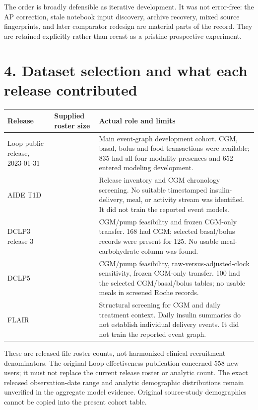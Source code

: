 \documentclass[11pt,a4paper]{article}
\begin{document}
The order is broadly defensible as iterative development. It was not error-free: the AP correction, stale notebook input discovery, archive recovery, mixed source fingerprints, and later comparator redesign are material parts of the record. They are retained explicitly rather than recast as a pristine prospective experiment.

\section*{4. Dataset selection and what each release contributed}
{\small
\setlength{\tabcolsep}{3pt}
\begin{longtable}{>{\raggedright\arraybackslash}p{}>{\raggedright\arraybackslash}p{}>{\raggedright\arraybackslash}p{}}
\toprule
\textbf{Release} & \textbf{Supplied roster size} & \textbf{Actual role and limits} \\ \midrule
\endhead
Loop public release, 2023-01-31 & 919 & Main event-graph development cohort. CGM, basal, bolus and food transactions were available; 835 had all four modality presences and 652 entered modeling development. \\
AIDE T1D & 109 & Release inventory and CGM chronology screening. No suitable timestamped insulin-delivery, meal, or activity stream was identified. It did not train the reported event models. \\
DCLP3 release 3 & 170 & CGM/pump feasibility and frozen CGM-only transfer. 168 had CGM; selected basal/bolus records were present for 125. No usable meal-carbohydrate column was found. \\
DCLP5 & 101 & CGM/pump feasibility, raw-versus-adjusted-clock sensitivity, frozen CGM-only transfer. 100 had the selected CGM/basal/bolus tables; no usable meals in screened Roche records. \\
FLAIR & 126 & Structural screening for CGM and daily treatment context. Daily insulin summaries do not establish individual delivery events. It did not train the reported event graph. \\
\bottomrule
\end{longtable}
}
These are released-file roster counts, not harmonized clinical recruitment denominators. The original Loop effectiveness publication concerned 558 new users; it must not replace the current release roster or analytic count. The exact released observation-date range and analytic demographic distributions remain unverified in the aggregate model evidence. Original source-study demographics cannot be copied into the present cohort table.
\end{document}
